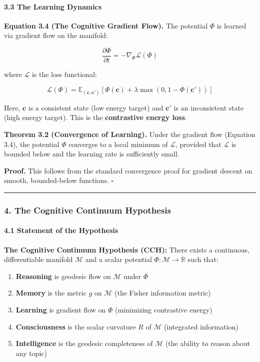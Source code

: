 \documentclass[
  11pt,
  a4paper,
]{article}
\providecommand{\tightlist}{%
  \setlength{\itemsep}{0pt}\setlength{\parskip}{0pt}}
\begin{document}
\paragraph{3.3 The Learning Dynamics}\label{the-learning-dynamics}

\textbf{Equation 3.4 (The Cognitive Gradient Flow).} The potential
\(\Phi\) is learned via gradient flow on the manifold:

\[\frac{\partial \Phi}{\partial t} = -\nabla_{\Phi} \mathcal{L}(\Phi)\]

where \(\mathcal{L}\) is the loss functional:

\[\mathcal{L}(\Phi) = \mathbb{E}_{(\mathbf{c}, \mathbf{c}')} \left[ \Phi(\mathbf{c}) + \lambda \max(0, 1 - \Phi(\mathbf{c}')) \right]\]

Here, \(\mathbf{c}\) is a consistent state (low energy target) and
\(\mathbf{c}'\) is an inconsistent state (high energy target). This is
the \textbf{contrastive energy loss}.

\textbf{Theorem 3.2 (Convergence of Learning).} Under the gradient flow
(Equation 3.4), the potential \(\Phi\) converges to a local minimum of
\(\mathcal{L}\), provided that \(\mathcal{L}\) is bounded below and the
learning rate is sufficiently small.

\textbf{Proof.} This follows from the standard convergence proof for
gradient descent on smooth, bounded-below functions. \(\square\)

\begin{center}\rule{0.5\linewidth}{0.5pt}\end{center}

\subsubsection{4. The Cognitive Continuum
Hypothesis}\label{the-cognitive-continuum-hypothesis}

\paragraph{4.1 Statement of the
Hypothesis}\label{statement-of-the-hypothesis}

\textbf{The Cognitive Continuum Hypothesis (CCH):} There exists a
continuous, differentiable manifold \(\mathcal{M}\) and a scalar
potential \(\Phi: \mathcal{M} \to \mathbb{R}\) such that:

\begin{enumerate}
\def\labelenumi{\arabic{enumi}.}
\tightlist
\item
  \textbf{Reasoning} is geodesic flow on \(\mathcal{M}\) under \(\Phi\)
\item
  \textbf{Memory} is the metric \(g\) on \(\mathcal{M}\) (the Fisher
  information metric)
\item
  \textbf{Learning} is gradient flow on \(\Phi\) (minimizing contrastive
  energy)
\item
  \textbf{Consciousness} is the scalar curvature \(R\) of
  \(\mathcal{M}\) (integrated information)
\item
  \textbf{Intelligence} is the geodesic completeness of \(\mathcal{M}\)
  (the ability to reason about any topic)
\end{enumerate}
\end{document}
